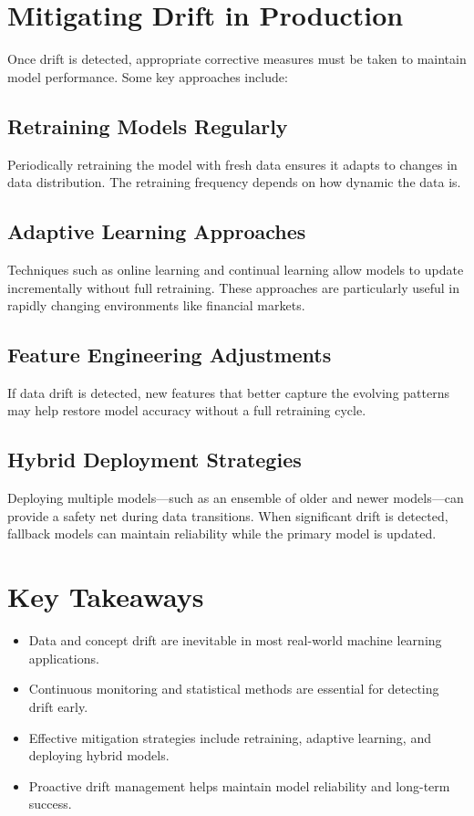 \documentclass[12pt,openany]{book}
\begin{document}
\section{Mitigating Drift in Production}

Once drift is detected, appropriate corrective measures must be taken to maintain model performance. Some key approaches include:

\subsection{Retraining Models Regularly}
Periodically retraining the model with fresh data ensures it adapts to changes in data distribution. The retraining frequency depends on how dynamic the data is.

\subsection{Adaptive Learning Approaches}
Techniques such as online learning and continual learning allow models to update incrementally without full retraining. These approaches are particularly useful in rapidly changing environments like financial markets.

\subsection{Feature Engineering Adjustments}
If data drift is detected, new features that better capture the evolving patterns may help restore model accuracy without a full retraining cycle.

\subsection{Hybrid Deployment Strategies}
Deploying multiple models—such as an ensemble of older and newer models—can provide a safety net during data transitions. When significant drift is detected, fallback models can maintain reliability while the primary model is updated.

\section{Key Takeaways}

\begin{itemize}
    \item Data and concept drift are inevitable in most real-world machine learning applications.
    \item Continuous monitoring and statistical methods are essential for detecting drift early.
    \item Effective mitigation strategies include retraining, adaptive learning, and deploying hybrid models.
    \item Proactive drift management helps maintain model reliability and long-term success.
\end{itemize}
\end{document}
